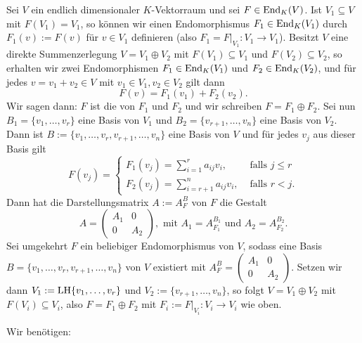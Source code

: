 \begin{lemma}
	\label{def:9.7}
	Sei $V$ ein endlich dimensionaler $K$-Vektorraum und sei $F \in \operatorname{End}_K(V)$.
	Ist $V_1 \subseteq V$ mit $F(V_1) = V_1$, so können wir einen Endomorphismus $F_1 \in \operatorname{End}_K(V_1)$ durch $F_1(v) := F(v)$ für $v \in V_1$ definieren (also $F_1 = F \big|_{V_1} \colon V_1 \rightarrow V_1$).
	Besitzt $V$ eine direkte Summenzerlegung $V = V_1 \oplus V_2$ mit $F(V_1) \subseteq V_1$ und $F(V_2) \subseteq V_2$, so erhalten wir zwei Endomorphismen $F_1 \in \operatorname{End}_K(V_1)$ und $F_2 \in \operatorname{End}_K(V_2)$, und für jedes $v = v_1 + v_2 \in V$ mit $v_1 \in V_1, v_2 \in V_2$ gilt dann
	\[
		F(v) = F_1(v_1) + F_2(v_2).
	\]
	Wir sagen dann: $F$ ist die  von $F_1$ und $F_2$ und wir schreiben $F = F_1 \oplus F_2$.
	Sei nun $B_1 = \{v_1,\dots,v_r\}$ eine Basis von $V_1$ und $B_2 = \{v_{r+1},\dots,v_n\}$ eine Basis von $V_2$.
	Dann ist \linebreak $B := \{v_1,\dots,v_r,v_{r+1},\dots,v_n\}$ eine Basis von $V$ und für jedes $v_j$ aus dieser Basis gilt
	\[
	F(v_j) = \begin{cases}
	F_1(v_j) = \sum_{i=1}^{r} a_{ij} v_i, & \text{ falls } j \leq r \\
	F_2(v_j) = \sum_{i=r+1}^{n} a_{ij} v_i, & \text{ falls } r < j.
	\end{cases}
	\]
	Dann hat die Darstellungsmatrix $A := A_F^B$ von $F$ die Gestalt
	\[
	A = \begin{pmatrix}
	A_1 & 0 \\
	0 & A_2
	\end{pmatrix}, \text{ mit } A_1 = A_{F_1}^{B_1} \text{ und } A_2 = A_{F_2}^{B_2}.
	\]
	Sei umgekehrt $F$ ein beliebiger Endomorphismus von $V$, sodass eine Basis $B = \{v_1,\dots, v_r,v_{r+1},\dots,v_n\}$ von $V$ existiert mit $A_F^B = \begin{pmatrix}
	A_1 & 0 \\
	0 & A_2
	\end{pmatrix}$.
	Setzen wir dann $V_1 := \operatorname{LH}\{v_1,\dots,v_r\}$ und $V_2 := \{v_{r+1},\dots,v_n\}$, so folgt $V = V_1 \oplus V_2$ mit $F(V_i) \subseteq V_i$, also $F = F_1 \oplus F_2$ mit $F_i := F\big|_{V_i} \colon V_i \rightarrow V_i$ wie oben.
\end{lemma}

Wir benötigen:

